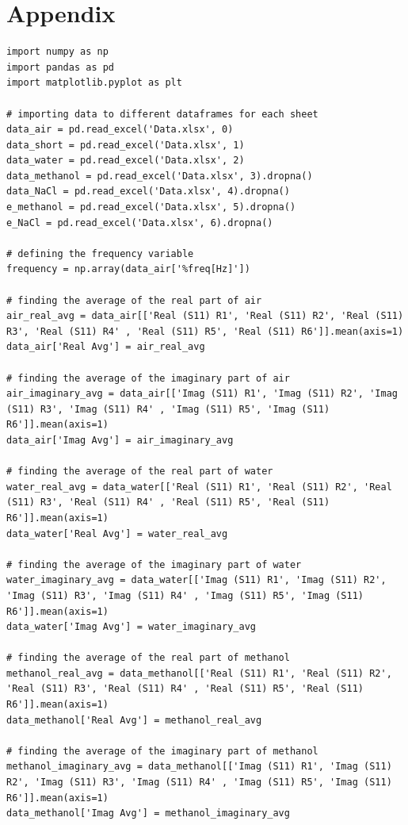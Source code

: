 \documentclass[12pt, a4paper]{article}
\begin{document}
\section{Appendix}
\begin{verbatim}
import numpy as np
import pandas as pd
import matplotlib.pyplot as plt

# importing data to different dataframes for each sheet
data_air = pd.read_excel('Data.xlsx', 0)
data_short = pd.read_excel('Data.xlsx', 1)
data_water = pd.read_excel('Data.xlsx', 2)
data_methanol = pd.read_excel('Data.xlsx', 3).dropna()
data_NaCl = pd.read_excel('Data.xlsx', 4).dropna()
e_methanol = pd.read_excel('Data.xlsx', 5).dropna()
e_NaCl = pd.read_excel('Data.xlsx', 6).dropna()

# defining the frequency variable
frequency = np.array(data_air['%freq[Hz]'])

# finding the average of the real part of air
air_real_avg = data_air[['Real (S11) R1', 'Real (S11) R2', 'Real (S11) R3', 'Real (S11) R4' , 'Real (S11) R5', 'Real (S11) R6']].mean(axis=1)
data_air['Real Avg'] = air_real_avg

# finding the average of the imaginary part of air
air_imaginary_avg = data_air[['Imag (S11) R1', 'Imag (S11) R2', 'Imag (S11) R3', 'Imag (S11) R4' , 'Imag (S11) R5', 'Imag (S11) R6']].mean(axis=1)
data_air['Imag Avg'] = air_imaginary_avg

# finding the average of the real part of water
water_real_avg = data_water[['Real (S11) R1', 'Real (S11) R2', 'Real (S11) R3', 'Real (S11) R4' , 'Real (S11) R5', 'Real (S11) R6']].mean(axis=1)
data_water['Real Avg'] = water_real_avg

# finding the average of the imaginary part of water
water_imaginary_avg = data_water[['Imag (S11) R1', 'Imag (S11) R2', 'Imag (S11) R3', 'Imag (S11) R4' , 'Imag (S11) R5', 'Imag (S11) R6']].mean(axis=1)
data_water['Imag Avg'] = water_imaginary_avg

# finding the average of the real part of methanol
methanol_real_avg = data_methanol[['Real (S11) R1', 'Real (S11) R2', 'Real (S11) R3', 'Real (S11) R4' , 'Real (S11) R5', 'Real (S11) R6']].mean(axis=1)
data_methanol['Real Avg'] = methanol_real_avg

# finding the average of the imaginary part of methanol
methanol_imaginary_avg = data_methanol[['Imag (S11) R1', 'Imag (S11) R2', 'Imag (S11) R3', 'Imag (S11) R4' , 'Imag (S11) R5', 'Imag (S11) R6']].mean(axis=1)
data_methanol['Imag Avg'] = methanol_imaginary_avg


\end{verbatim}
\end{document}

